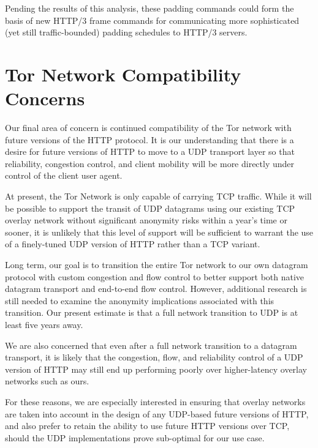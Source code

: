 \documentclass[letterpaper,11pt]{llncs}
\begin{document}
Pending the results of this analysis, these padding commands could form the
basis of new HTTP/3 frame commands for communicating more sophisticated (yet
still traffic-bounded) padding schedules to HTTP/3 servers.


\section{Tor Network Compatibility Concerns}

Our final area of concern is continued compatibility of the Tor network with
future versions of the HTTP protocol. It is our understanding that there is a
desire for future versions of HTTP to move to a UDP transport layer so that
reliability, congestion control, and client mobility will be more directly
under control of the client user agent.

At present, the Tor Network is only capable of carrying TCP traffic. While it
will be possible to support the transit of UDP datagrams using our existing
TCP overlay network without significant anonymity risks within a year's time
or sooner, it is unlikely that this level of support will be sufficient to
warrant the use of a finely-tuned UDP version of HTTP rather than a TCP
variant.

Long term, our goal is to transition the entire Tor network to our own
datagram protocol with custom congestion and flow control to better support
both native datagram transport and end-to-end flow control. However,
additional research is still needed to examine the anonymity implications
associated with this transition. Our present estimate is that a full network
transition to UDP is at least five years away.

We are also concerned that even after a full network transition to a datagram
transport, it is likely that the congestion, flow, and reliability control of
a UDP version of HTTP may still end up performing poorly over higher-latency
overlay networks such as ours.

For these reasons, we are especially interested in ensuring that overlay
networks are taken into account in the design of any UDP-based future versions
of HTTP, and also prefer to retain the ability to use future HTTP versions
over TCP, should the UDP implementations prove sub-optimal for our use case.



 

\clearpage
\appendix
\end{document}

